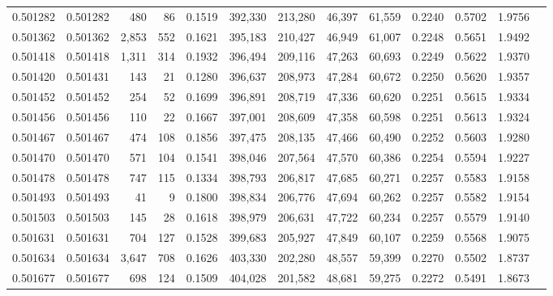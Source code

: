 \begin{tabular}{rrrrrrrrrrrrr}
0.501282 & 0.501282 &   480 &    86 &                                     0.1519 & 392,330 & 213,280 &  46,397 &  61,559 & 0.2240 & 0.5702 & 1.9756 \\
0.501362 & 0.501362 & 2,853 &   552 &                                     0.1621 & 395,183 & 210,427 &  46,949 &  61,007 & 0.2248 & 0.5651 & 1.9492 \\
0.501418 & 0.501418 & 1,311 &   314 &                                     0.1932 & 396,494 & 209,116 &  47,263 &  60,693 & 0.2249 & 0.5622 & 1.9370 \\
0.501420 & 0.501431 &   143 &    21 &                                     0.1280 & 396,637 & 208,973 &  47,284 &  60,672 & 0.2250 & 0.5620 & 1.9357 \\
0.501452 & 0.501452 &   254 &    52 &                                     0.1699 & 396,891 & 208,719 &  47,336 &  60,620 & 0.2251 & 0.5615 & 1.9334 \\
0.501456 & 0.501456 &   110 &    22 &                                     0.1667 & 397,001 & 208,609 &  47,358 &  60,598 & 0.2251 & 0.5613 & 1.9324 \\
0.501467 & 0.501467 &   474 &   108 &                                     0.1856 & 397,475 & 208,135 &  47,466 &  60,490 & 0.2252 & 0.5603 & 1.9280 \\
0.501470 & 0.501470 &   571 &   104 &                                     0.1541 & 398,046 & 207,564 &  47,570 &  60,386 & 0.2254 & 0.5594 & 1.9227 \\
0.501478 & 0.501478 &   747 &   115 &                                     0.1334 & 398,793 & 206,817 &  47,685 &  60,271 & 0.2257 & 0.5583 & 1.9158 \\
0.501493 & 0.501493 &    41 &     9 &                                     0.1800 & 398,834 & 206,776 &  47,694 &  60,262 & 0.2257 & 0.5582 & 1.9154 \\
0.501503 & 0.501503 &   145 &    28 &                                     0.1618 & 398,979 & 206,631 &  47,722 &  60,234 & 0.2257 & 0.5579 & 1.9140 \\
0.501631 & 0.501631 &   704 &   127 &                                     0.1528 & 399,683 & 205,927 &  47,849 &  60,107 & 0.2259 & 0.5568 & 1.9075 \\
0.501634 & 0.501634 & 3,647 &   708 &                                     0.1626 & 403,330 & 202,280 &  48,557 &  59,399 & 0.2270 & 0.5502 & 1.8737 \\
0.501677 & 0.501677 &   698 &   124 &                                     0.1509 & 404,028 & 201,582 &  48,681 &  59,275 & 0.2272 & 0.5491 & 1.8673 \\

\end{tabular}
